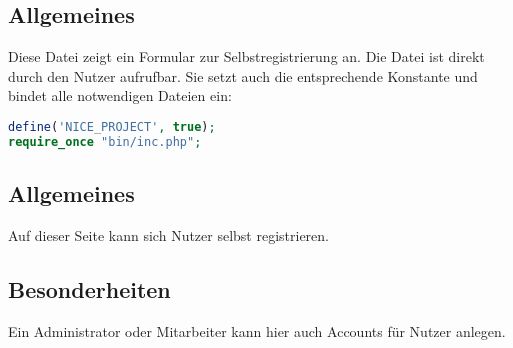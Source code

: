 \subsection{Allgemeines} Diese Datei zeigt ein Formular zur Selbstregistrierung an.
Die Datei ist direkt durch den Nutzer aufrufbar. Sie setzt auch die entsprechende Konstante und bindet alle notwendigen Dateien ein:
\begin{lstlisting}[language=php]
define('NICE_PROJECT', true);
require_once "bin/inc.php";
\end{lstlisting}
\subsection{Allgemeines}
Auf dieser Seite kann sich Nutzer selbst registrieren.
\subsection{Besonderheiten}
Ein Administrator oder Mitarbeiter kann hier auch Accounts für Nutzer anlegen.
